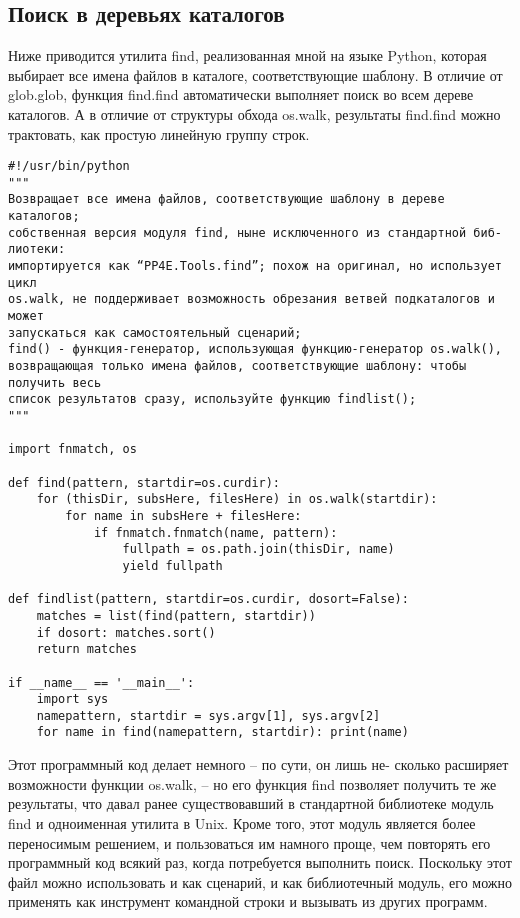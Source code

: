 \documentclass[12pt]{article}
\begin{document}
\subsection{Поиск в деревьях каталогов}
Ниже приводится утилита find, реализованная мной на языке
Python, которая выбирает все имена файлов в каталоге, соответствующие шаблону. В отличие от glob.glob, функция find.find автоматически
выполняет поиск во всем дереве каталогов. А в отличие от структуры
обхода os.walk, результаты find.find можно трактовать, как простую линейную группу строк.
\begin{verbatim}
#!/usr/bin/python
"""
Возвращает все имена файлов, соответствующие шаблону в дереве каталогов;
собственная версия модуля find, ныне исключенного из стандартной биб­лиотеки:
импортируется как “PP4E.Tools.find”; похож на оригинал, но использует цикл
os.walk, не поддерживает возможность обрезания ветвей подкаталогов и может
запускаться как самостоятельный сценарий;
find() - функция-генератор, использующая функцию-генератор os.walk(),
возвращающая только имена файлов, соответствующие шаблону: чтобы получить весь
список результатов сразу, используйте функцию findlist();
"""

import fnmatch, os

def find(pattern, startdir=os.curdir):
    for (thisDir, subsHere, filesHere) in os.walk(startdir):
        for name in subsHere + filesHere:
            if fnmatch.fnmatch(name, pattern):
                fullpath = os.path.join(thisDir, name)
                yield fullpath

def findlist(pattern, startdir=os.curdir, dosort=False):
    matches = list(find(pattern, startdir))
    if dosort: matches.sort()
    return matches

if __name__ == '__main__':
    import sys
    namepattern, startdir = sys.argv[1], sys.argv[2]
    for name in find(namepattern, startdir): print(name)
\end{verbatim}
Этот программный код делает немного – по сути, он лишь не-
сколько расширяет возможности функции os.walk, – но его функция
find позволяет получить те же результаты, что давал ранее существовавший в стандартной биб­лиотеке модуль find и одноименная утилита
в Unix. Кроме того, этот модуль является более переносимым решением, и пользоваться им намного проще, чем повторять его программный
код всякий раз, когда потребуется выполнить поиск. Поскольку этот
файл можно использовать и как сценарий, и как биб­лиотечный модуль,
его можно применять как инструмент командной строки и вызывать из
других программ.
\end{document}
